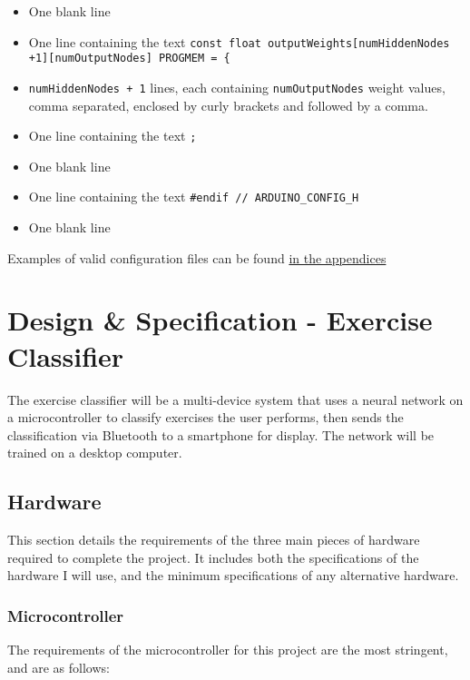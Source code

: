 \documentclass[a4paper]{article}
\begin{document}
\begin{itemize}
\item One blank line
\item One line containing the text \lstinline|const float outputWeights[numHiddenNodes +1][numOutputNodes] PROGMEM = {|
\item \lstinline{numHiddenNodes + 1} lines, each containing \lstinline{numOutputNodes} weight values, comma separated, enclosed by curly brackets and followed by a comma.
\item One line containing the text \lstinline|;|
\item One blank line
\item One line containing the text \lstinline{#endif // ARDUINO_CONFIG_H}
\item One blank line
\end{itemize}

Examples of valid configuration files can be found \hyperref[subsec:a2_configfiles]{in the appendices}

\newpage
\section{Design \& Specification - Exercise Classifier}
\label{sec:dc}

The exercise classifier will be a multi-device system that uses a neural network on a microcontroller to classify exercises the user performs, then sends the classification via Bluetooth to a smartphone for display. The network will be trained on a desktop computer.

\subsection{Hardware}%
\label{subsec:dc_hardware}

This section details the requirements of the three main pieces of hardware required to complete the project. It includes both the specifications of the hardware I will use, and the minimum specifications of any alternative hardware.

\subsubsection{Microcontroller}

The requirements of the microcontroller for this project are the most stringent, and are as follows:
\end{document}
